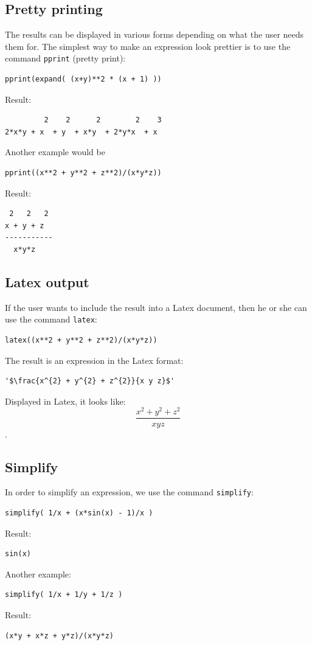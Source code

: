 \documentclass[article,A4,12pt]{llncs}
\begin{document}
\subsection{Pretty printing}
The results can be displayed in various forms depending on what 
the user needs them for. The simplest way to make an expression 
look prettier is to use the command {\tt pprint} (pretty print):
\begin{verbatim}
pprint(expand( (x+y)**2 * (x + 1) ))
\end{verbatim}
Result:
\begin{verbatim}
         2    2      2        2    3
2*x*y + x  + y  + x*y  + 2*y*x  + x
\end{verbatim}
Another example would be
\begin{verbatim}
pprint((x**2 + y**2 + z**2)/(x*y*z))
\end{verbatim}
Result:
\begin{verbatim}
 2   2   2
x + y + z
-----------
  x*y*z   
\end{verbatim}

\subsection{Latex output}
If the user wants to include the result into a Latex document, then 
he or she can use the command {\tt latex}:
\begin{verbatim}
latex((x**2 + y**2 + z**2)/(x*y*z))
\end{verbatim}
The result is an expression in the Latex format:
\begin{verbatim}
'$\frac{x^{2} + y^{2} + z^{2}}{x y z}$'
\end{verbatim}
Displayed in Latex, it looks like:
$$
\frac{x^{2} + y^{2} + z^{2}}{x y z}
$$.

\subsection{Simplify}

In order to simplify an expression, we use the command {\tt simplify}:
\begin{verbatim}
simplify( 1/x + (x*sin(x) - 1)/x )
\end{verbatim}
Result:
\begin{verbatim}
sin(x)
\end{verbatim}
Another example:
\begin{verbatim}
simplify( 1/x + 1/y + 1/z )
\end{verbatim}
Result:
\begin{verbatim}
(x*y + x*z + y*z)/(x*y*z)
\end{verbatim}
\end{document}
